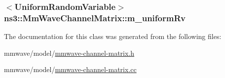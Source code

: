 \subsubsection[{\texorpdfstring{m\+\_\+uniform\+Rv}{m_uniformRv}}]{$<${\bf Uniform\+Random\+Variable}$>$ ns3\+::\+Mm\+Wave\+Channel\+Matrix\+::m\+\_\+uniform\+Rv\hspace{0.3cm}{\ttfamily [private]}}\hypertarget{classns3_1_1MmWaveChannelMatrix_a914afe40a958ddccd64a99f86190be0c}{}\label{classns3_1_1MmWaveChannelMatrix_a914afe40a958ddccd64a99f86190be0c}


The documentation for this class was generated from the following files\+:\begin{DoxyCompactItemize}
\item 
mmwave/model/\hyperlink{mmwave-channel-matrix_8h}{mmwave-\/channel-\/matrix.\+h}\item 
mmwave/model/\hyperlink{mmwave-channel-matrix_8cc}{mmwave-\/channel-\/matrix.\+cc}\end{DoxyCompactItemize}
